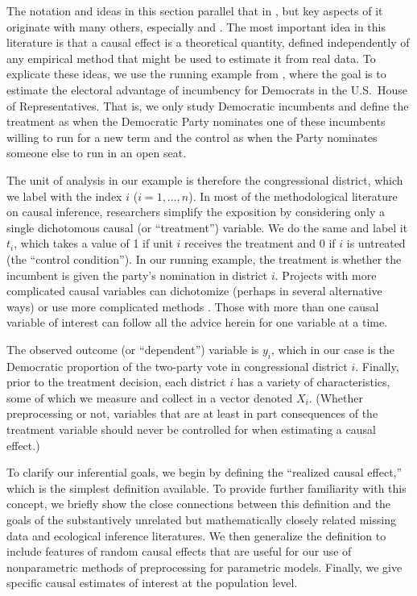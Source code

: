 \documentclass[11pt,titlepage]{article}
\begin{document}
The notation and ideas in this section parallel that in
\citet[][Section 3.1.1]{KinKeoVer94}, but key aspects of it originate
with many others, especially \citet{Rubin74} and \citet{Holland86}.
The most important idea in this literature is that a causal effect is
a theoretical quantity, defined independently of any empirical method
that might be used to estimate it from real data.  To explicate these
ideas, we use the running example from \citet[][Section
3.1.1]{KinKeoVer94}, where the goal is to estimate the electoral
advantage of incumbency for Democrats in the U.S.\ House of
Representatives.  That is, we only study Democratic incumbents and
define the treatment as when the Democratic Party nominates one of
these incumbents willing to run for a new term and the control as when
the Party nominates someone else to run in an open seat.

The unit of analysis in our example is therefore the congressional
district, which we label with the index $i$ ($i=1,\dots,n$).  In most
of the methodological literature on causal inference, researchers
simplify the exposition by considering only a single dichotomous
causal (or ``treatment'') variable.  We do the same and label it
$t_i$, which takes a value of 1 if unit $i$ receives the treatment and
0 if $i$ is untreated (the ``control condition'').  In our running
example, the treatment is whether the incumbent is given the party's
nomination in district $i$.  Projects with more complicated causal
variables can dichotomize (perhaps in several alternative ways) or use
more complicated methods \citep{ImaDyk03}.  Those with more than one
causal variable of interest can follow all the advice herein for one
variable at a time.

The observed outcome (or ``dependent'') variable is $y_i$, which in
our case is the Democratic proportion of the two-party vote in
congressional district $i$.  Finally, prior to the treatment decision,
each district $i$ has a variety of characteristics, some of which we
measure and collect in a vector denoted $X_i$.  (Whether preprocessing
or not, variables that are at least in part consequences of the
treatment variable should never be controlled for when estimating a
causal effect.)

To clarify our inferential goals, we begin by defining the ``realized
causal effect,'' which is the simplest definition available.  To
provide further familiarity with this concept, we briefly show the
close connections between this definition and the goals of the
substantively unrelated but mathematically closely related missing
data and ecological inference literatures.  We then generalize the
definition to include features of random causal effects that are
useful for our use of nonparametric methods of preprocessing for
parametric models.  Finally, we give specific causal estimates of
interest at the population level.
\end{document}
